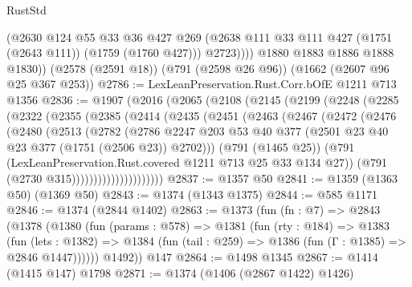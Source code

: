 \begin{lexlean}{RustStd}
\begin{coremodule}
              (@2630
                @124
                @55
                @33
                @36
                @427
                @269
                (@2638 @111 @33 @111 @427 (@1751 (@2643 @111)) (@1759 (@1760 @427)))
                @2723))))
        @1880
        @1883
        @1886
        @1888
        @1830))
    (@2578 (@2591 @18))
    (@791 (@2598 @26 @96))
    (@1662 (@2607 @96 @25 @367 @253))
@2786 := LexLeanPreservation.Rust.Corr.bOfE @1211 @713 @1356
@2836 := @1907
    (@2016
      (@2065
        (@2108
          (@2145
            (@2199
              (@2248
                (@2285
                  (@2322
                    (@2355
                      (@2385
                        (@2414
                          (@2435
                            (@2451
                              (@2463
                                (@2467
                                  (@2472
                                    (@2476
                                      (@2480
                                        (@2513
                                          (@2782
                                            (@2786
                                              @2247
                                              @203
                                              @53
                                              @40
                                              @377
                                              (@2501 @23 @40 @23 @377 (@1751 (@2506 @23)) @2702)))
                                          (@791 (@1465 @25))
                                          (@791
                                            (LexLeanPreservation.Rust.covered
                                              @1211
                                              @713
                                              @25
                                              @33
                                              @134
                                              @27))
                                          (@791 (@2730 @315)))))))))))))))))))))
@2837 := @1357 @50
@2841 := @1359 (@1363 @50) (@1369 @50)
@2843 := @1374 (@1343 @1375)
@2844 := @585 @1171
@2846 := @1374 (@2844 @1402)
@2863 := @1373
    (fun (fn : @7) =>
    @2843
      (@1378
        (@1380
          (fun (params : @578) =>
          @1381
            (fun (rty : @184) =>
            @1383
              (fun (lets : @1382) =>
              @1384 (fun (tail : @259) => @1386 (fun (Γ : @1385) => @2846 @1447))))))
        @1492))
    @147
@2864 := @1498 @1345
@2867 := @1414 (@1415 @147) @1798
@2871 := @1374 (@1406 (@2867 @1422) @1426)

\end{coremodule}
\end{lexlean}
